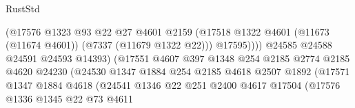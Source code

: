 \begin{lexlean}{RustStd}
\begin{coremodule}
                                            (@17576
                                              @1323
                                              @93
                                              @22
                                              @27
                                              @4601
                                              @2159
                                              (@17518
                                                @1322
                                                @4601
                                                (@11673 (@11674 @4601))
                                                (@7337 (@11679 @1322 @22)))
                                              @17595))))
                                      @24585
                                      @24588
                                      @24591
                                      @24593
                                      @14393)
                                    (@17551
                                      @4607
                                      @397
                                      @1348
                                      @254
                                      @2185
                                      @2774
                                      @2185
                                      @4620
                                      @24230
                                      (@24530
                                        @1347
                                        @1884
                                        @254
                                        @2185
                                        @4618
                                        @2507
                                        @1892
                                        (@17571
                                          @1347
                                          @1884
                                          @4618
                                          (@24541
                                            @1346
                                            @22
                                            @251
                                            @2400
                                            @4617
                                            @17504
                                            (@17576
                                              @1336
                                              @1345
                                              @22
                                              @73
                                              @4611

\end{coremodule}
\end{lexlean}
